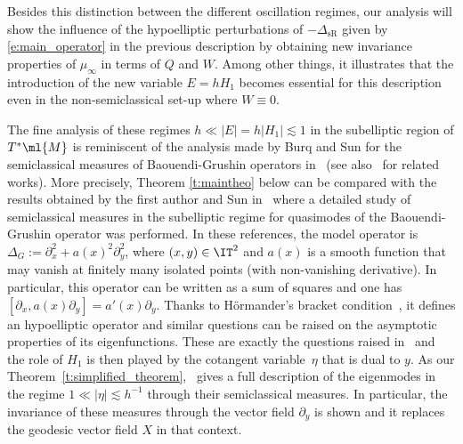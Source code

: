 \documentclass[JEP,XML,SOM,Unicode, NoEqCountersInSection,published]{cedram}
\theoremstyle{plain}
\theoremstyle{definition}
\theoremstyle{remark}
\begin{document}
Besides this distinction between the different oscillation regimes, our analysis will show the influence of the hypoelliptic perturbations of $-\Delta_{\text{sR}}$ given by \eqref{e:main_operator} in the previous description by obtaining new invariance properties of $\mu_\infty$ in terms of $Q$ and $W$. Among other things, it illustrates that the introduction of the new variable $E=hH_1$ becomes essential for this description even in the non-semiclassical set-up where $W\equiv 0$.


The fine analysis of these regimes $h\ll |E|=h|H_1|\lesssim 1$ in the subelliptic region of $T^*\ml{M}$ is reminiscent of the analysis made by Burq and Sun for the semiclassical measures of Baouendi-Grushin operators in~\cite{BurqSun22} (see also~\cite{LetrouitSun20, ArnaizSun22} for related works). More precisely, Theorem \ref{t:maintheo} below can be compared with the results obtained by the first author and Sun in~\cite{ArnaizSun22} where a detailed study of semiclassical measures in the subelliptic regime for quasimodes of the Baouendi-Grushin operator was performed. In these references, the model operator is $\Delta_G:=\partial_x^2+ a(x)^2\partial_y^2$, where $(x,y)\in\IT^2$ and $a(x)$ is a smooth function that may vanish at finitely many isolated points (with non-vanishing derivative). In particular, this operator can be written as a sum of squares and one has $[\partial_x,a(x) \partial_y]= a'(x)\partial_y$. Thanks to Hörmander's bracket condition~\cite{Hormander67}, it defines an hypoelliptic operator and similar questions can be raised on the asymptotic properties of its eigenfunctions. These are exactly the questions raised in~\cite{BurqSun22} and the role of $H_1$ is then played by the cotangent variable~$\eta$ that is dual to $y$. As our Theorem~\ref{t:simplified_theorem},~\cite[\S3]{ArnaizSun22} gives a full description of the eigenmodes in the regime $1\ll |\eta|\lesssim h^{-1}$ through their semiclassical measures. In particular, the invariance of these measures through the vector field $\partial_y$ is shown and it replaces the geodesic vector field $X$ in that context.
\end{document}
